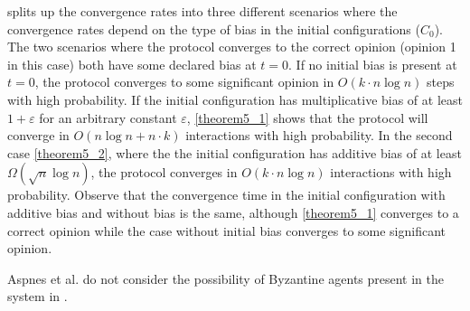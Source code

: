   splits up the convergence rates into three different scenarios where the convergence rates depend on the type of bias in the initial configurations ($C_0$). The two scenarios where the protocol converges to the correct opinion (opinion 1 in this case) both have some declared bias at $t = 0$. If no initial bias is present at $t = 0$, the protocol converges to some significant opinion in $O(k \cdot n \log n)$ steps with high probability. If the initial configuration has multiplicative bias of at least $1 + \varepsilon$ for an arbitrary constant $\varepsilon$, \ref{theorem5_1} shows that the protocol will converge in $O(n \log n + n \cdot k)$ interactions with high probability. In the second case \ref{theorem5_2}, where the the initial configuration has additive bias of at least $\Omega(\sqrt{n} \log n)$, the protocol converges in $O(k \cdot n \log n)$ interactions with high probability. Observe that the convergence time in the initial configuration with additive bias and without bias is the same, although \ref{theorem5_1} converges to a correct opinion while the case without initial bias converges to some significant opinion. 

 Aspnes et al. do not consider the possibility of Byzantine agents present in the system in \cite{AspnesFastConverganceOfKOpinion2023}. 


